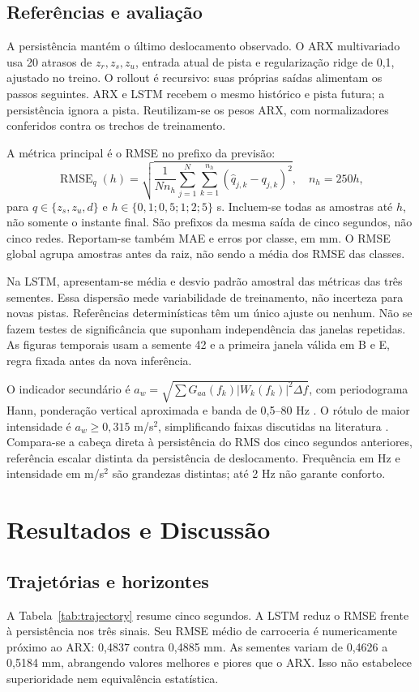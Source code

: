 \documentclass[conference]{IEEEtran}
\begin{document}
\subsection{Referências e avaliação}
A persistência mantém o último deslocamento observado. O ARX multivariado usa 20 atrasos de $z_r,z_s,z_u$, entrada atual de pista e regularização ridge de 0,1, ajustado no treino. O rollout é recursivo: suas próprias saídas alimentam os passos seguintes. ARX e LSTM recebem o mesmo histórico e pista futura; a persistência ignora a pista. Reutilizam-se os pesos ARX, com normalizadores conferidos contra os trechos de treinamento.

A métrica principal é o RMSE no prefixo da previsão:
\begin{equation}
\operatorname{RMSE}_q(h)=
\sqrt{\frac{1}{Nn_h}\sum_{j=1}^{N}\sum_{k=1}^{n_h}
(\hat q_{j,k}-q_{j,k})^2},\quad n_h=250h,
\end{equation}
para $q\in\{z_s,z_u,d\}$ e $h\in\{0{,}1;0{,}5;1;2;5\}$ s. Incluem-se todas as amostras até $h$, não somente o instante final. São prefixos da mesma saída de cinco segundos, não cinco redes. Reportam-se também MAE e erros por classe, em mm. O RMSE global agrupa amostras antes da raiz, não sendo a média dos RMSE das classes.

Na LSTM, apresentam-se média e desvio padrão amostral das métricas das três sementes. Essa dispersão mede variabilidade de treinamento, não incerteza para novas pistas. Referências determinísticas têm um único ajuste ou nenhum. Não se fazem testes de significância que suponham independência das janelas repetidas. As figuras temporais usam a semente 42 e a primeira janela válida em B e E, regra fixada antes da nova inferência.

O indicador secundário é $a_w=\sqrt{\sum G_{aa}(f_k)|W_k(f_k)|^2\Delta f}$, com periodograma Hann, ponderação vertical aproximada e banda de 0,5--80 Hz \cite{vasquez}. O rótulo de maior intensidade é $a_w\geq0{,}315$ m/s$^2$, simplificando faixas discutidas na literatura \cite{comfort}. Compara-se a cabeça direta à persistência do RMS dos cinco segundos anteriores, referência escalar distinta da persistência de deslocamento. Frequência em Hz e intensidade em m/s$^2$ são grandezas distintas; até 2 Hz não garante conforto.

\section{Resultados e Discussão}
\subsection{Trajetórias e horizontes}
A Tabela~\ref{tab:trajectory} resume cinco segundos. A LSTM reduz o RMSE frente à persistência nos três sinais. Seu RMSE médio de carroceria é numericamente próximo ao ARX: 0,4837 contra 0,4885 mm. As sementes variam de 0,4626 a 0,5184 mm, abrangendo valores melhores e piores que o ARX. Isso não estabelece superioridade nem equivalência estatística.
\end{document}
